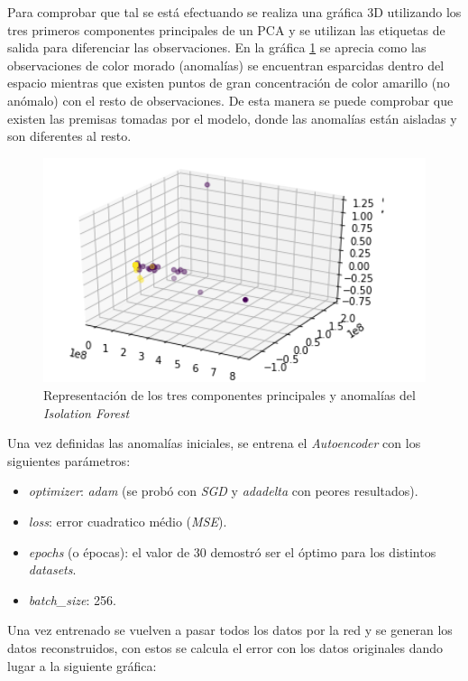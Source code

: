 Para comprobar que tal se está efectuando se realiza una gráfica 3D utilizando los tres primeros componentes principales de un PCA y se utilizan las etiquetas de salida para diferenciar las observaciones. En la gráfica \ref{fig:pca_iso} se aprecia como las observaciones de color morado (anomalías) se encuentran esparcidas dentro del espacio mientras que existen puntos de gran concentración de color amarillo (no anómalo) con el resto de observaciones. De esta manera se puede comprobar que existen las premisas tomadas por el modelo, donde las anomalías están aisladas y son diferentes al resto.

\begin{figure}[h]
    \centering
    \includegraphics[width=12cm]{figs/pca_iso.PNG}
    \caption{Representación de los tres componentes principales y anomalías del \textit{Isolation Forest}}
    \label{fig:pca_iso}
\end{figure}

Una vez definidas las anomalías iniciales, se entrena el \textit{Autoencoder} con los siguientes parámetros:

\begin{itemize}
    \item \textit{optimizer}: \textit{adam} (se probó con \textit{SGD} y \textit{adadelta} con peores resultados).
    \item \textit{loss}: error cuadratico médio (\textit{MSE}).
    \item \textit{epochs} (o épocas): el valor de 30 demostró ser el óptimo para los distintos \textit{datasets}.
    \item \textit{batch\_size}: 256.
\end{itemize}

Una vez entrenado se vuelven a pasar todos los datos por la red y se generan los datos reconstruidos, con estos se calcula el error con los datos originales dando lugar a la siguiente gráfica:

